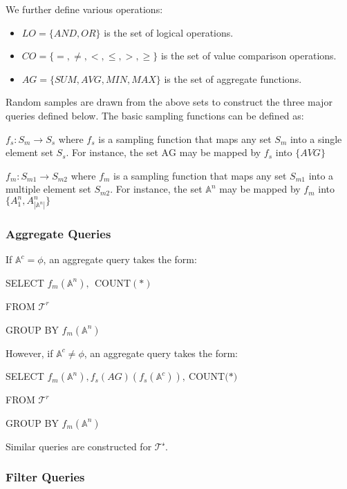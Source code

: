 We further define various operations:

\begin{itemize}
\item
  \(LO = \{ AND,OR\}\) is the set of logical operations.
\item
  \(CO = \{ = , \neq , < , \leq , > , \geq \}\) is the set of value
  comparison operations.
\item
  \(AG = \{ SUM,AVG,MIN,MAX\}\) is the set of aggregate functions.
\end{itemize}

Random samples are drawn from the above sets to construct the three
major queries defined below. The basic sampling functions can be defined
as:

\(f_{s}:S_{m} \rightarrow S_{s}\) where \(f_{s}\) is a sampling function
that maps any set \(S_{m}\) into a single element set \(S_{s}\). For
instance, the set \(\text{AG}\) may be mapped by \(f_{s}\) into
\(\{ AVG\}\)

\(f_{m}:S_{m1} \rightarrow S_{m2}\) where \(f_{m}\) is a sampling
function that maps any set \(S_{m1}\) into a multiple element set
\(S_{m2}\). For instance, the set \(\mathbb{A}^{n}\) may be mapped by
\(f_{m}\) into \(\{ A_{1}^{n},A_{|\mathbb{A}^{n}|}^{n}\}\)

\hypertarget{aggregate-queries}{%
\subsubsection{Aggregate Queries}\label{aggregate-queries}}

If \(\mathbb{A}^{c} = \phi\), an aggregate query takes the form:

SELECT
\(f_{m}\left( \mathbb{A}^{n} \right)\mathrm{,\ \ COUNT}\mathrm{(*)}\)

FROM \(\mathcal{T}^{r}\)

GROUP BY \(f_{m}(\mathbb{A}^{n})\)

However, if \(\mathbb{A}^{c} \neq \phi\), an aggregate query takes the
form:

SELECT
\(f_{m}(\mathbb{A}^{n}),f_{s}(AG)(f_{s}(\mathbb{A}^{c}))\mathrm{,\ }\mathrm{COUNT(}\mathrm{*)}\)

FROM \(\mathcal{T}^{r}\)

GROUP BY \(f_{m}(\mathbb{A}^{n})\)

Similar queries are constructed for \(\mathcal{T}^{\mathcal{s}}\).

\hypertarget{filter-queries}{%
\subsubsection{Filter Queries}\label{filter-queries}}

